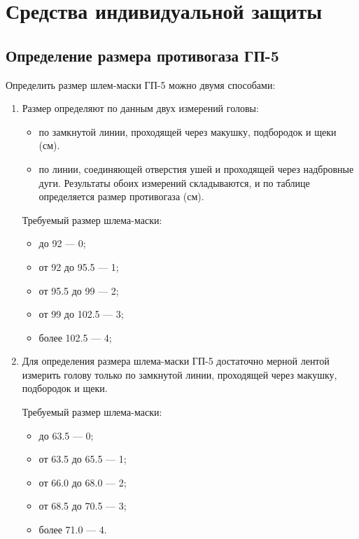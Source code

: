 







\Ukrainian

\section*{Средства индивидуальной защиты}
\subsection*{Определение размера противогаза ГП-5}
Определить размер шлем-маски ГП-5 можно двумя способами:
\begin{enumerate}
	\item Размер определяют по данным двух измерений головы:
	\begin{itemize}
		\item по замкнутой линии, проходящей через макушку, подбородок и щеки (см).
		\item по линии, соединяющей отверстия ушей и проходящей через надбровные дуги. Результаты обоих измерений складываются, и по таблице определяется размер противогаза (см).
	\end{itemize} 
	
	Требуемый размер шлема-маски:
	\begin{itemize}
		\item до 92 --- 0;
		\item от 92 до 95.5 --- 1;
		\item от 95.5 до 99 --- 2;
		\item от 99 до 102.5 --- 3;
		\item более 102.5 --- 4;
	\end{itemize}
	\item Для определения размера шлема-маски ГП-5 достаточно мерной лентой измерить голову только по замкнутой линии, проходящей через макушку, подбородок и щеки.

	Требуемый размер шлема-маски:
	\begin{itemize} 
		\item до 63.5 --- 0;
		\item от 63.5 до 65.5 --- 1;
		\item от 66.0 до 68.0 --- 2;
		\item от 68.5 до 70.5 --- 3;
		\item более 71.0 –-- 4.
	\end{itemize}
\end{enumerate}


